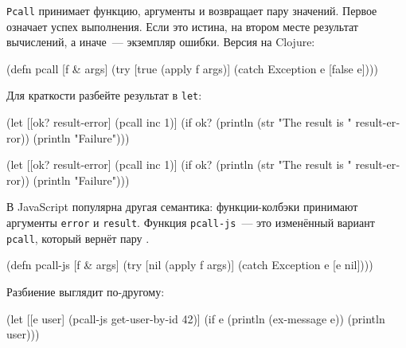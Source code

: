 \verb|Pcall| принимает функцию, аргументы и возвращает пару значений. Первое
означает успех выполнения. Если это истина, на втором месте результат
вычислений, а иначе~--- экземпляр ошибки. Версия на Clojure:


\begin{english}
  \begin{clojure}
(defn pcall [f & args]
  (try
    [true (apply f args)]
    (catch Exception e [false e])))
  \end{clojure}
\end{english}

Для краткости разбейте результат в \verb|let|:

\ifx\devicetype\mobile

\begin{english}
  \begin{clojure}
(let [[ok? result-error] (pcall inc 1)]
  (if ok?
    (println
      (str "The result is "
        result-error))
    (println "Failure")))
  \end{clojure}
\end{english}

\else

\begin{english}
  \begin{clojure}
(let [[ok? result-error] (pcall inc 1)]
  (if ok?
    (println (str "The result is " result-error))
    (println "Failure")))
  \end{clojure}
\end{english}

\fi


В JavaScript популярна другая семантика: функции-колбэки принимают аргументы
\verb|error| и \verb|result|. Функция \verb|pcall-js|~--- это изменённый
вариант \verb|pcall|, который вернёт пару .

\begin{english}
  \begin{clojure}
(defn pcall-js [f & args]
  (try
    [nil (apply f args)]
    (catch Exception e [e nil])))
  \end{clojure}
\end{english}

\noindent
Разбиение выглядит по-другому:

\ifx\devicetype\mobile

\begin{english}
  \begin{clojure}
(let [[e user]
      (pcall-js get-user-by-id 42)]
  (if e
    (println (ex-message e))
    (println user)))
  \end{clojure}
\end{english}


